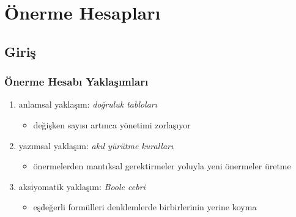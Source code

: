 \documentclass[dvipsnames]{beamer}
\theoremstyle{definition}
\theoremstyle{example}
\newtheorem{ornek}[theorem]{Örnek}
\theoremstyle{plain}
\begin{document}
%
%
%

\section{Önerme Hesapları}

\subsection{Giriş}

\begin{frame}
  \frametitle{Önerme Hesabı Yaklaşımları}

  \begin{enumerate}
    \item anlamsal yaklaşım: \emph{doğruluk tabloları}
    \begin{itemize}
      \item değişken sayısı artınca yönetimi zorlaşıyor
    \end{itemize}

    \pause
    \item yazımsal yaklaşım: \emph{akıl yürütme kuralları}
    \begin{itemize}
      \item önermelerden mantıksal gerektirmeler yoluyla yeni önermeler üretme
    \end{itemize}

    \pause
    \item aksiyomatik yaklaşım: \emph{Boole cebri}
    \begin{itemize}
      \item eşdeğerli formülleri denklemlerde birbirlerinin yerine koyma
    \end{itemize}
  \end{enumerate}
\end{frame}
\end{document}
